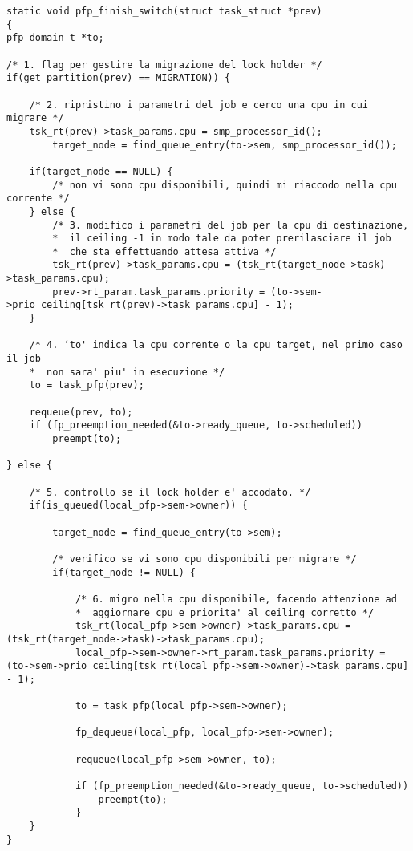 \documentclass[a4paper,11pt]{article}
\begin{document}
\begin{lstlisting}
static void pfp_finish_switch(struct task_struct *prev)
{
pfp_domain_t *to;	

/* 1. flag per gestire la migrazione del lock holder */
if(get_partition(prev) == MIGRATION)) {
	
	/* 2. ripristino i parametri del job e cerco una cpu in cui migrare */
	tsk_rt(prev)->task_params.cpu = smp_processor_id();
    	target_node = find_queue_entry(to->sem, smp_processor_id());
		
	if(target_node == NULL) {
		/* non vi sono cpu disponibili, quindi mi riaccodo nella cpu corrente */
	} else {
		/* 3. modifico i parametri del job per la cpu di destinazione,
		*  il ceiling -1 in modo tale da poter prerilasciare il job 
		*  che sta effettuando attesa attiva */
		tsk_rt(prev)->task_params.cpu = (tsk_rt(target_node->task)->task_params.cpu);
		prev->rt_param.task_params.priority = (to->sem->prio_ceiling[tsk_rt(prev)->task_params.cpu] - 1);
	}

	/* 4. ‘to' indica la cpu corrente o la cpu target, nel primo caso il job 
	*  non sara' piu' in esecuzione */
	to = task_pfp(prev);

	requeue(prev, to);
	if (fp_preemption_needed(&to->ready_queue, to->scheduled))
		preempt(to);

} else {

	/* 5. controllo se il lock holder e' accodato. */	
	if(is_queued(local_pfp->sem->owner)) {

		target_node = find_queue_entry(to->sem);
			
		/* verifico se vi sono cpu disponibili per migrare */			
		if(target_node != NULL) {
			
			/* 6. migro nella cpu disponibile, facendo attenzione ad 				
			*  aggiornare cpu e priorita' al ceiling corretto */
			tsk_rt(local_pfp->sem->owner)->task_params.cpu = (tsk_rt(target_node->task)->task_params.cpu);
			local_pfp->sem->owner->rt_param.task_params.priority =  (to->sem->prio_ceiling[tsk_rt(local_pfp->sem->owner)->task_params.cpu] - 1);
								
			to = task_pfp(local_pfp->sem->owner);
							
			fp_dequeue(local_pfp, local_pfp->sem->owner);
									
			requeue(local_pfp->sem->owner, to);
		
			if (fp_preemption_needed(&to->ready_queue, to->scheduled))
				preempt(to);
			}
	}
}

\end{lstlisting}
\end{document}

